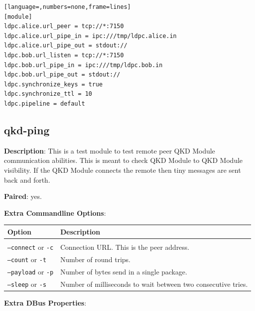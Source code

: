 \begin{lstlisting}[language=,numbers=none,frame=lines]
[module]
ldpc.alice.url_peer = tcp://*:7150
ldpc.alice.url_pipe_in = ipc:///tmp/ldpc.alice.in
ldpc.alice.url_pipe_out = stdout://
ldpc.bob.url_listen = tcp://*:7150
ldpc.bob.url_pipe_in = ipc:///tmp/ldpc.bob.in
ldpc.bob.url_pipe_out = stdout://
ldpc.synchronize_keys = true
ldpc.synchronize_ttl = 10
ldpc.pipeline = default
\end{lstlisting}

\clearpage


\subsection{qkd-ping}
\label{subsec:qkd-ping}

\textbf{Description}: This is a test module to test remote peer QKD Module communication abilities. This is meant to check QKD Module to QKD Module visibility. If the QKD Module connects the remote then tiny messages are sent back and forth.

\bigskip

\noindent \textbf{Paired}: yes.

\bigskip

\noindent \textbf{Extra Commandline Options}:

\medskip

\begin{tabular}{lp{10cm}}

Option                                  & Description \\
\hline
\\
\texttt{--connect} or \texttt{-c}       & Connection URL. This is the peer address. \\ [0.5em]
\texttt{--count} or \texttt{-t}         & Number of round trips. \\ [0.5em]
\texttt{--payload} or \texttt{-p}       & Number of bytes send in a single package. \\ [0.5em]
\texttt{--sleep} or \texttt{-s}         & Number of milliseconds to wait between two consecutive tries. \\ [0.5em]

\end{tabular}

\bigskip

\noindent \textbf{Extra DBus Properties}:

\medskip

